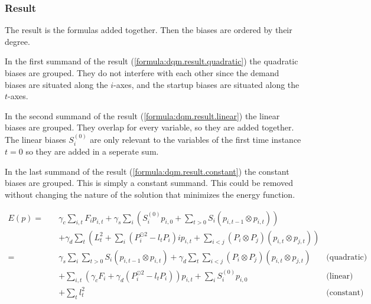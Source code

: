 \subsubsection{Result}

The result is the formulas added together.
Then the biases are ordered by their degree.

In the first summand of the result (\ref{formula:dqm.result.quadratic}) the quadratic biases are grouped.
They do not interfere with each other since the demand biases are situated along the $i$-axes, and the startup biases are situated along the $t$-axes.

In the second summand of the result (\ref{formula:dqm.result.linear}) the linear biases are grouped.
They overlap for every variable, so they are added together.
The linear biases $S_i^{(0)}$ are only relevant to the variables of the first time instance $t = 0$ so they are added in a seperate sum.

In the last summand of the result (\ref{formula:dqm.result.constant}) the constant biases are grouped.
This is simply a constant summand.
This could be removed without changing the nature of the solution that minimizes the energy function.

\begin{subequations}
\begin{align}
  E(p) = \quad
  &
  \gamma_c \sum_{i, t} F_i p_{i, t}
  + \gamma_s \sum_i \left(
      S_i^{(0)} p_{i, 0}
      + \sum_{t > 0} S_i \left( p_{i, t-1} \otimes p_{i, t} \right)
    \right)
  \\ &
  + \gamma_d \sum_t \left(
    L_t^2
    + \sum_i \left( P_i^{\odot 2} - l_t P_i \right)i p_{i, t}
    + \sum_{i < j} \left( P_i \otimes P_j \right) \left( p_{i, t} \otimes p_{j, t} \right)
  \right) \\
  = \quad
  &
  \gamma_s \sum_i \sum_{t > 0} S_i \left( p_{i, t-1} \otimes p_{i, t} \right)
  + \gamma_d \sum_t \sum_{i < j} \left( P_i \otimes P_j \right) \left( p_{i, t} \otimes p_{j, t} \right)
  & \text{(quadratic)}
  \label{formula:dqm.result.quadratic}
  \\ &
  + \sum_{i, t} \left(
    \gamma_c F_i + \gamma_d \left(P_i^{\odot 2} - l_t P_i \right)
  \right) p_{i, t}
  + \sum_i S_i^{(0)} p_{i, 0}
  & \text{(linear)}
  \label{formula:dqm.result.linear}
  \\ &
  + \sum_t l_t^2
  & \text{(constant)}
  \label{formula:dqm.result.constant}
\end{align}
\end{subequations}
